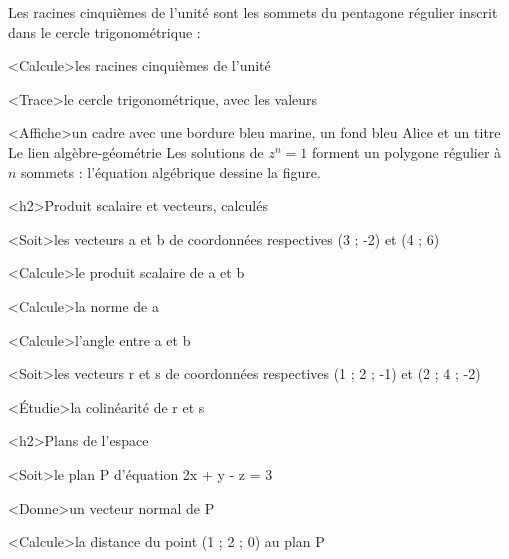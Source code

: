 \documentclass[marges=20, taille=11]{texecole}
\begin{document}
Les racines cinquièmes de l'unité sont les sommets du pentagone régulier inscrit dans le cercle trigonométrique :

<Calcule>les racines cinquièmes de l'unité

<Trace>le cercle trigonométrique, avec les valeurs

<Affiche>un cadre avec une bordure bleu marine, un fond bleu Alice et un titre {Le lien algèbre-géométrie} {
	Les solutions de $z^n = 1$ forment un polygone régulier à $n$
	sommets : l'équation algébrique dessine la figure.
}

<h2>Produit scalaire et vecteurs, calculés

<Soit>les vecteurs a et b de coordonnées respectives (3 ; -2) et (4 ; 6)

<Calcule>le produit scalaire de a et b

<Calcule>la norme de a

<Calcule>l'angle entre a et b

<Soit>les vecteurs r et s de coordonnées respectives (1 ; 2 ; -1) et (2 ; 4 ; -2)

<Étudie>la colinéarité de r et s

<h2>Plans de l'espace

<Soit>le plan P d'équation 2x + y - z = 3

<Donne>un vecteur normal de P

<Calcule>la distance du point (1 ; 2 ; 0) au plan P
\end{document}
